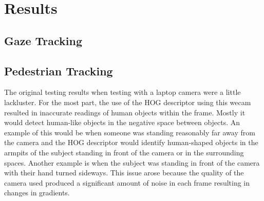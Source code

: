 \section{Results}

\subsection{Gaze Tracking}


\subsection{Pedestrian Tracking}
The original testing results when testing with a laptop camera were a little lackluster. For the most part, the use of the HOG descriptor using this wecam resulted in inaccurate readings of human objects within the frame. Mostly it would detect human-like objects in the negative space between objects. An example of this would be when someone was standing reasonably far away from the camera and the HOG descriptor would identify human-shaped objects in the armpits of the subject standing in front of the camera or in the surrounding spaces. Another example is when the subject was standing in front of the camera with their hand turned sideways. This issue arose because the quality of the camera used produced a significant amount of noise in each frame resulting in changes in gradients.\\



